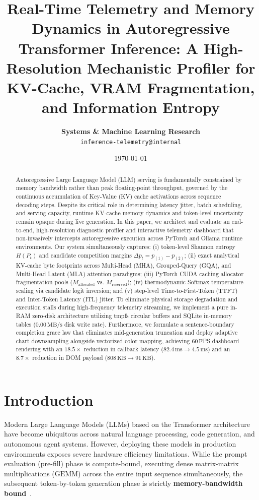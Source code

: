 \documentclass[10pt,twocolumn]{article}
\title{\textbf{Real-Time Telemetry and Memory Dynamics in Autoregressive Transformer Inference: A High-Resolution Mechanistic Profiler for KV-Cache, VRAM Fragmentation, and Information Entropy}}
\author{
    \textbf{Systems \& Machine Learning Research} \\
    \texttt{inference-telemetry@internal}
}
\date{\today}
\begin{document}
\maketitle

\begin{abstract}
Autoregressive Large Language Model (LLM) serving is fundamentally constrained by memory bandwidth rather than peak floating-point throughput, governed by the continuous accumulation of Key-Value (KV) cache activations across sequence decoding steps. Despite its critical role in determining latency jitter, batch scheduling, and serving capacity, runtime KV-cache memory dynamics and token-level uncertainty remain opaque during live generation. In this paper, we architect and evaluate an end-to-end, high-resolution diagnostic profiler and interactive telemetry dashboard that non-invasively intercepts autoregressive execution across PyTorch and Ollama runtime environments. Our system simultaneously captures: (i) token-level Shannon entropy $H(P_t)$ and candidate competition margins $\Delta p_t = p_{(1)} - p_{(2)}$; (ii) exact analytical KV-cache byte footprints across Multi-Head (MHA), Grouped-Query (GQA), and Multi-Head Latent (MLA) attention paradigms; (iii) PyTorch CUDA caching allocator fragmentation pools ($M_{\text{allocated}}$ vs. $M_{\text{reserved}}$); (iv) thermodynamic Softmax temperature scaling via candidate logit inversion; and (v) step-level Time-to-First-Token (TTFT) and Inter-Token Latency (ITL) jitter. To eliminate physical storage degradation and execution stalls during high-frequency telemetry streaming, we implement a pure in-RAM zero-disk architecture utilizing tmpfs circular buffers and SQLite in-memory tables ($0.00\,\text{MB/s}$ disk write rate). Furthermore, we formulate a sentence-boundary completion grace law that eliminates mid-generation truncation and deploy adaptive chart downsampling alongside vectorized color mapping, achieving 60\,FPS dashboard rendering with an $18.5\times$ reduction in callback latency ($82.4\,\text{ms} \to 4.5\,\text{ms}$) and an $8.7\times$ reduction in DOM payload ($808\,\text{KB} \to 91\,\text{KB}$).
\end{abstract}

\section{Introduction}
Modern Large Language Models (LLMs) based on the Transformer architecture~\cite{vaswani2017attention} have become ubiquitous across natural language processing, code generation, and autonomous agent systems. However, deploying these models in production environments exposes severe hardware efficiency limitations. While the prompt evaluation (pre-fill) phase is compute-bound, executing dense matrix-matrix multiplications ($\mathrm{GEMM}$) across the entire input sequence simultaneously, the subsequent token-by-token generation phase is strictly \textbf{memory-bandwidth bound}~\cite{kwon2023efficient}.
\end{document}
